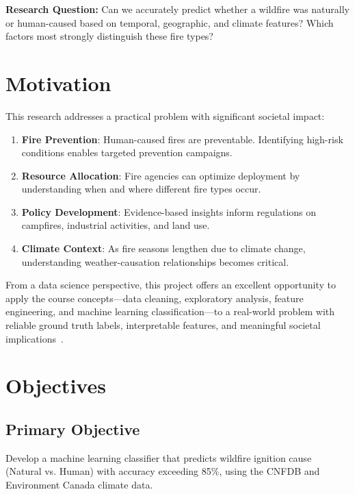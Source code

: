 \documentclass[sigconf,nonacm]{acmart}
\begin{document}
\textbf{Research Question:} Can we accurately predict whether a wildfire was naturally or human-caused based on temporal, geographic, and climate features? Which factors most strongly distinguish these fire types?

\section{Motivation}

This research addresses a practical problem with significant societal impact:

\begin{enumerate}
    \item \textbf{Fire Prevention}: Human-caused fires are preventable. Identifying high-risk conditions enables targeted prevention campaigns.
    
    \item \textbf{Resource Allocation}: Fire agencies can optimize deployment by understanding when and where different fire types occur.
    
    \item \textbf{Policy Development}: Evidence-based insights inform regulations on campfires, industrial activities, and land use.
    
    \item \textbf{Climate Context}: As fire seasons lengthen due to climate change, understanding weather-causation relationships becomes critical.
\end{enumerate}

From a data science perspective, this project offers an excellent opportunity to apply the course concepts---data cleaning, exploratory analysis, feature engineering, and machine learning classification---to a real-world problem with reliable ground truth labels, interpretable features, and meaningful societal implications~\cite{flannigan}.

\section{Objectives}

\subsection{Primary Objective}
Develop a machine learning classifier that predicts wildfire ignition cause (Natural vs. Human) with accuracy exceeding 85\%, using the CNFDB and Environment Canada climate data.
\end{document}
